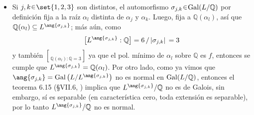 \begin{sol}
\begin{enumerate}[label=\alph*)]
\begin{itemize}
    \item 
    Si $j,k\en\set{1,2,3}$ son distintos, el automorfismo $\sigma_{j,k}\en\gal(L/\mathbb{Q})$ por definición fija a la raíz $\alpha_l$ distinta de $\alpha_{j}$ y $\alpha_{k}$. Luego, fija a $\mathbb{Q}(\alpha_l)$, así que $\mathbb{Q}(\alpha_l) \subseteq L^{\ang{\sigma_{j,k}}}$; más aún, como 
    \[
    \brack[\big]{L^{\ang{\sigma_{j,k}}} : \mathbb{Q}}%
    ={6}\,/\,{\abs*{\sigma_{j,k}}} = 3
    \]
    y también $\brack{\mathbb{Q}(\alpha_l):\mathbb{Q}} = 3$ ya que el pol. mínimo de $\alpha_l$ sobre $\mathbb{Q}$ es $f$, entonces se cumple que $L^{\ang{\sigma_{j,k}}} = \mathbb{Q}(\alpha_l)$. Por otro lado, como ya vimos que $\ang{\sigma_{j,k}} = \gal\big(L/L^{\ang{\sigma_{j,k}}}\big)$ no es normal en $\operatorname{Gal}(L/\mathbb{Q})$, entonces el teorema 6.15 (\S VII.6, \cite{aluffi}) implica que $L^{\ang{\sigma_{j,k}}}/\mathbb{Q}$ no es de Galois, sin embargo, sí es separable (en característica cero, toda extensión es separable), por lo tanto $L^{\ang{\sigma_{j,k}}}/\mathbb{Q}$ no es normal.


\end{itemize}
\end{enumerate}
\end{sol}
